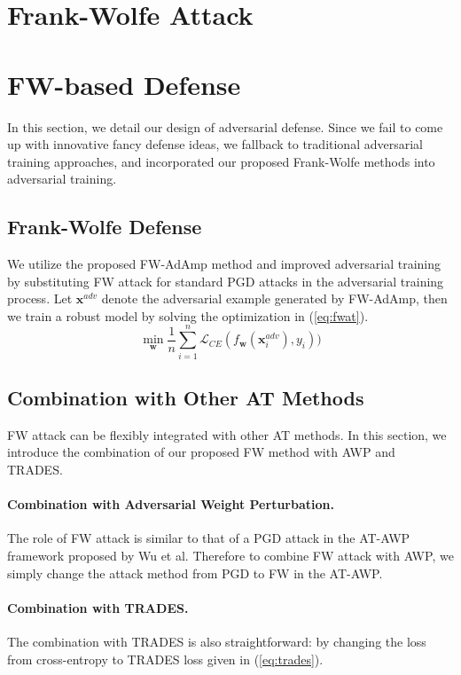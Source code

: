 \documentclass{article}
\begin{document}
\section{Frank-Wolfe Attack}\label{sec:AttackMethodology}


\section{FW-based Defense}\label{sec:DefenseMethodology}
    In this section, we detail our design of adversarial defense. Since we fail to come up with innovative fancy defense ideas, we fallback to traditional adversarial training approaches, and incorporated our proposed Frank-Wolfe methods into adversarial training.

    \subsection{Frank-Wolfe Defense}
        We utilize the proposed FW-AdAmp method and improved adversarial training by substituting FW attack for standard PGD attacks in the adversarial training process. Let $\mathbf{x}^{adv}$ denote the adversarial example generated by FW-AdAmp, then we train a robust model by solving the optimization in (\ref{eq:fwat}).
        \begin{equation}\label{eq:fwat}
            \min_{\mathbf{w}} \frac{1}{n}\sum_{i=1}^n \mathcal{L}_{CE}(f_{\mathbf{w}}(\mathbf{x}^{adv}_i), y_i))
        \end{equation}

    \subsection{Combination with Other AT Methods}
        FW attack can be flexibly integrated with other AT methods. In this section, we introduce the combination of our proposed FW method with AWP and TRADES.

        \paragraph{Combination with Adversarial Weight Perturbation.} The role of FW attack is similar to that of a PGD attack in the AT-AWP framework proposed by Wu et al. Therefore to combine FW attack with AWP, we simply change the attack method from PGD to FW in the AT-AWP.

        \paragraph{Combination with TRADES.} The combination with TRADES is also straightforward: by changing the loss from cross-entropy to TRADES loss given in (\ref{eq:trades}).
\end{document}

